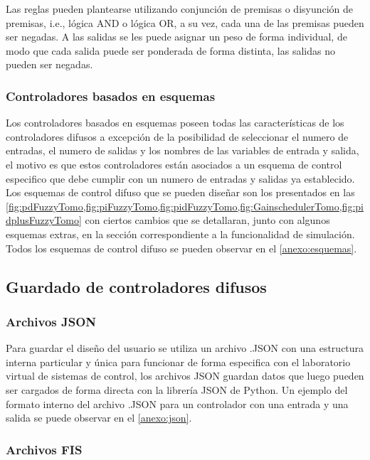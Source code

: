                 Las reglas pueden plantearse utilizando conjunción de premisas o disyunción de premisas, i.e., lógica AND o lógica OR, a su vez, cada una de las premisas pueden ser negadas. A las salidas se les puede asignar un peso de forma individual, de modo que cada salida puede ser ponderada de forma distinta, las salidas no pueden ser negadas.

        \subsubsection{Controladores basados en esquemas}

            Los controladores basados en esquemas poseen todas las características de los controladores difusos a excepción de la posibilidad de seleccionar el numero de entradas, el numero de salidas y los nombres de las variables de entrada y salida, el motivo es que estos controladores están asociados a un esquema de control especifico que debe cumplir con un numero de entradas y salidas ya establecido. Los esquemas de control difuso que se pueden diseñar son los presentados en las \cref{fig:pdFuzzyTomo,fig:piFuzzyTomo,fig:pidFuzzyTomo,fig:GainschedulerTomo,fig:pidplusFuzzyTomo} con ciertos cambios que se detallaran, junto con algunos esquemas extras, en la sección correspondiente a la funcionalidad de simulación. Todos los esquemas de control difuso se pueden observar en el \ref{anexo:esquemas}.

    \subsection{Guardado de controladores difusos}

        \subsubsection{Archivos JSON}
        
            Para guardar el diseño del usuario se utiliza un archivo .JSON con una estructura interna particular y única para funcionar de forma especifica con el laboratorio virtual de sistemas de control, los archivos JSON guardan datos que luego pueden ser cargados de forma directa con la librería JSON de Python. Un ejemplo del formato interno del archivo .JSON para un controlador con una entrada y una salida se puede observar en el \ref{anexo:json}.

        \subsubsection{Archivos FIS}

